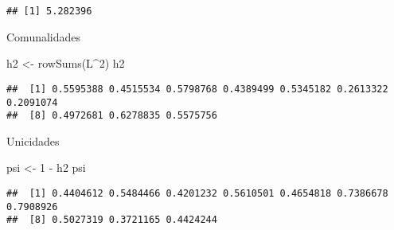 \documentclass[
]{article}
\newenvironment{Shaded}{\begin{snugshade}}{\end{snugshade}}
\newcommand{\CommentTok}[1]{\textcolor[rgb]{0.56,0.35,0.01}{\textit{#1}}}
\newcommand{\DecValTok}[1]{\textcolor[rgb]{0.00,0.00,0.81}{#1}}
\newcommand{\FunctionTok}[1]{\textcolor[rgb]{0.00,0.00,0.00}{#1}}
\newcommand{\NormalTok}[1]{#1}
\newcommand{\OtherTok}[1]{\textcolor[rgb]{0.56,0.35,0.01}{#1}}
\newcommand{\SpecialCharTok}[1]{\textcolor[rgb]{0.00,0.00,0.00}{#1}}
\begin{document}
\begin{Shaded}
\end{Shaded}

\begin{verbatim}
## [1] 5.282396
\end{verbatim}

\begin{Shaded}
\end{Shaded}

Comunalidades

\begin{Shaded}
\begin{Highlighting}[]
\NormalTok{h2 }\OtherTok{\textless{}{-}} \FunctionTok{rowSums}\NormalTok{(L}\SpecialCharTok{\^{}}\DecValTok{2}\NormalTok{)}
\NormalTok{h2}
\end{Highlighting}
\end{Shaded}

\begin{verbatim}
##  [1] 0.5595388 0.4515534 0.5798768 0.4389499 0.5345182 0.2613322 0.2091074
##  [8] 0.4972681 0.6278835 0.5575756
\end{verbatim}

Unicidades

\begin{Shaded}
\begin{Highlighting}[]
\NormalTok{psi }\OtherTok{\textless{}{-}} \DecValTok{1} \SpecialCharTok{{-}}\NormalTok{ h2}
\NormalTok{psi}
\end{Highlighting}
\end{Shaded}

\begin{verbatim}
##  [1] 0.4404612 0.5484466 0.4201232 0.5610501 0.4654818 0.7386678 0.7908926
##  [8] 0.5027319 0.3721165 0.4424244
\end{verbatim}
\end{document}

